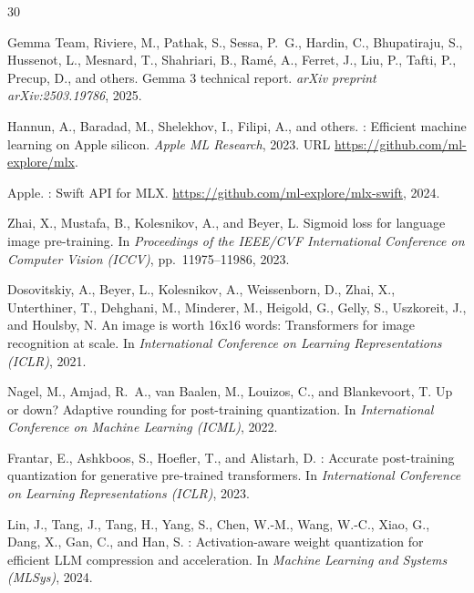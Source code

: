 \documentclass[11pt]{article}
\begin{document}
\begin{thebibliography}{30}

Gemma Team, Riviere, M., Pathak, S., Sessa, P.~G., Hardin, C., Bhupatiraju, S., Hussenot, L., Mesnard, T., Shahriari, B., Ramé, A., Ferret, J., Liu, P., Tafti, P., Precup, D., and others.
\newblock Gemma 3 technical report.
\newblock \emph{arXiv preprint arXiv:2503.19786}, 2025.

Hannun, A., Baradad, M., Shelekhov, I., Filipi, A., and others.
: Efficient machine learning on {Apple} silicon.
\newblock \emph{Apple ML Research}, 2023.
\newblock URL \url{https://github.com/ml-explore/mlx}.

Apple.
: Swift API for {MLX}.
\newblock \url{https://github.com/ml-explore/mlx-swift}, 2024.

Zhai, X., Mustafa, B., Kolesnikov, A., and Beyer, L.
\newblock Sigmoid loss for language image pre-training.
\newblock In \emph{Proceedings of the IEEE/CVF International Conference on Computer Vision (ICCV)}, pp.\ 11975--11986, 2023.

Dosovitskiy, A., Beyer, L., Kolesnikov, A., Weissenborn, D., Zhai, X., Unterthiner, T., Dehghani, M., Minderer, M., Heigold, G., Gelly, S., Uszkoreit, J., and Houlsby, N.
\newblock An image is worth 16x16 words: Transformers for image recognition at scale.
\newblock In \emph{International Conference on Learning Representations (ICLR)}, 2021.

Nagel, M., Amjad, R.~A., van Baalen, M., Louizos, C., and Blankevoort, T.
\newblock Up or down? {A}daptive rounding for post-training quantization.
\newblock In \emph{International Conference on Machine Learning (ICML)}, 2022.

Frantar, E., Ashkboos, S., Hoefler, T., and Alistarh, D.
: Accurate post-training quantization for generative pre-trained transformers.
\newblock In \emph{International Conference on Learning Representations (ICLR)}, 2023.

Lin, J., Tang, J., Tang, H., Yang, S., Chen, W.-M., Wang, W.-C., Xiao, G., Dang, X., Gan, C., and Han, S.
: Activation-aware weight quantization for efficient {LLM} compression and acceleration.
\newblock In \emph{Machine Learning and Systems (MLSys)}, 2024.


\end{thebibliography}
\end{document}
